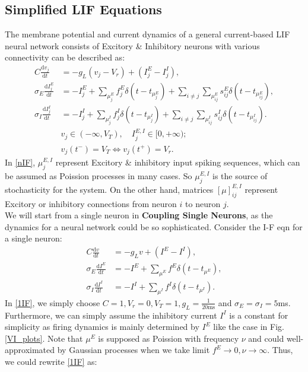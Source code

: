 \documentclass[10pt]{article}
\begin{document}
\begin{multicols}{2}
\subsection{Simplified LIF Equations}
The membrane potential and current dynamics of  a general current-based LIF neural network consists of Excitory \& Inhibitory neurons with various connectivity can be described as:
\begin{subequations}
\begin{align}
    C\frac{\mbox{d}v_{j}}{\mbox{d}t} &=  - g_L(v_j-V_{r})+(I^{E}_{j}-I^I_{j}), \nonumber \\
    \sigma_E\frac{\mbox{d}I^{E}_{j}}{\mbox{d}t} &= -I^{E}_{j}+\sum_{\mu^{E}_{j}}f^{E}_{j}\delta(t-t_{\mu^{E}_{j}}) + \sum_{i\neq j}\sum_{\mu^{E}_{ij}}s^{E}_{ij}\delta(t-t_{\mu^{E}_{ij}}), \nonumber \\
    \sigma_I\frac{\mbox{d}I^I_{j}}{\mbox{d}t} &= -I^I_{j}+\sum_{\mu^I_{j}}f^I_{j}\delta(t-t_{\mu^I_{j}}) + \sum_{i\neq j}\sum_{\mu^I_{ij}}s^I_{ij}\delta(t-t_{\mu^I_{ij}}). \label{nIF}\\
    & v_{j}\in (-\infty, V_T),\quad  I^{E,I}_{j}\in [0,+\infty); \nonumber\\
    & v_{j}(t^-)=V_T \Leftrightarrow v_{j}(t^+)= V_{r}. \label{BC}
\end{align}
\end{subequations}
In \ref{nIF}, $\mu^{E,I}_{j}$ represent Excitory \& inhibitory input spiking sequences, which can be assumed as Poission processes in many cases. So $\mu^{E,I}_{j}$ is the source of stochasticity for the system. On the other hand, matrices $[\mu]^{E,I}_{ij}$ represent Excitory or inhibitory connections from neuron $i$ to neuron $j$.\\ 
\indent
We will start from a single neuron in {\bf Coupling Single Neurons}, as the dynamics for a neural network could be so sophisticated. Consider the I-F eqn for a single neuron:
\begin{subequations}
\begin{align}
    C\frac{\mbox{d}v}{\mbox{d}t} &=  - g_Lv+(I^{E}-I^I), \nonumber\\
    \sigma_E\frac{\mbox{d}I^{E}}{\mbox{d}t} &= -I^E+\sum_{\mu^{E}}f^{E}\delta(t-t_{\mu^{E}}),  \nonumber\\ \label{1IF}
    \sigma_I\frac{\mbox{d}I^I}{\mbox{d}t} &= -I^I+\sum_{\mu^I}f^I\delta(t-t_{\mu^I}). 
\end{align}
\end{subequations}
In \ref{1IF}, we simply choose $C = 1, V_r = 0, V_T = 1, g_L = \frac{1}{20\mbox{ms}}$ and $\sigma_E = \sigma_I = 5$ms. Furthermore, we can simply assume the inhibitory current $I^I$ is a constant for simplicity as firing dynamics is mainly determined by $I^{E}$ like the case in Fig.\ref{VI_plots}. Note that $\mu^{E}$ is supposed as Poission with frequency $\nu$ and could well-approximated by Gaussian processes when we take limit $f^E\to 0,\nu\to \infty$. Thus, we could rewrite \ref{1IF} as:

\end{multicols}
\end{document}
